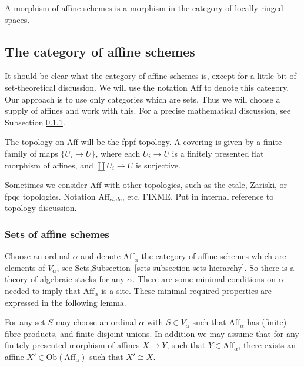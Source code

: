 \smallskip\noindent
A morphism of affine schemes is a morphism in the category of locally ringed 
spaces.

\subsection{The category of affine schemes}
\label{subsection-affine-schemes}

\noindent
It should be clear what the category of affine schemes is, except for a
little bit of set-theoretical discussion. We will use the notation
$\text{Aff}$ to denote this category. Our approach is to use only
categories which are sets. Thus we will choose a supply of affines and
work with this. For a precise mathematical discussion, see
Subsection \ref{subsection-sets-of-affines}.

\smallskip\noindent
The topology on $\text{Aff}$ will be the fppf topology. A covering is
given by a finite family of maps $\{U_i \to U\}$, where each $U_i \to U$
is a finitely presented flat morphism of affines, and $\coprod U_i \to U$
is surjective. 

\smallskip\noindent
Sometimes we consider $\text{Aff}$ with other topologies, such as the
etale, Zariski, or fpqc topologies. Notation $\text{Aff}_{etale}$, etc.
FIXME. Put in internal reference to topology discussion.

\subsubsection{Sets of affine schemes}
\label{subsection-sets-of-affines}

\noindent
Choose an ordinal $\alpha$ and denote $\text{Aff}_\alpha$ the
category of affine schemes which are elements of $V_\alpha$, see
Sets,\hyperref[sets-subsection-sets-hierarchy]%
{Subsection~\ref*{sets-subsection-sets-hierarchy}}. So there is a
theory of algebraic stacks for any $\alpha$. There are some minimal
conditions on $\alpha$ needed to imply that $\text{Aff}_\alpha$ is a site. 
These minimal required properties are expressed in the following lemma.

\begin{lemma}
\label{lemma-Aff-site}
For any set $S$ may choose an ordinal $\alpha$ with $S \in V_\alpha$ 
such that $\text{Aff}_\alpha$ has (finite) fibre products, and finite disjoint
unions. In addition we may assume that for any finitely presented morphism
of affines $X \to Y$, such that $Y \in \text{Aff}_\alpha$, there exists
an affine $X' \in \text{Ob}(\text{Aff}_\alpha)$ such that $X' \cong X$.
\end{lemma}

